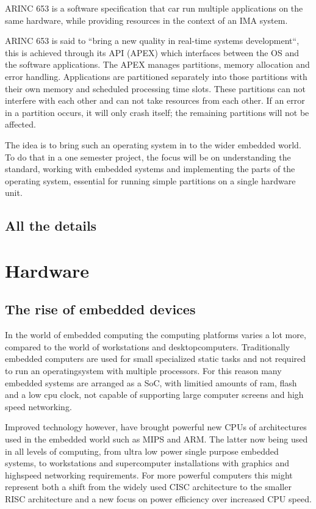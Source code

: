 ARINC 653 is a software specification that car run multiple applications on the same hardware, while providing resources in the context of an IMA system.

ARINC 653 is said to “bring a new quality in real-time systems development“,
this is achieved through its API (APEX) which interfaces between the OS and the software applications.
The APEX manages partitions, memory allocation and error handling.
Applications are partitioned separately into those partitions with their own memory and scheduled processing time slots.
These partitions can not interfere with each other and can not take resources from each other.
If an error in a partition occurs, it will only crash itself; the remaining partitions will not be affected.

The idea is to bring such an operating system in to the wider embedded world.
To do that in a one semester project, the focus will be on understanding the standard,
working with embedded systems and implementing the parts of the operating system,
essential for running simple partitions on a single hardware unit.

\subsection{All the details}


\section{Hardware}
\subsection{The rise of embedded devices}
In the world of embedded computing the computing platforms varies a lot more,
compared to the world of workstations and desktopcomputers.
Traditionally embedded computers are used for small specialized static tasks and
not required to run an operatingsystem with multiple processors.
For this reason many embedded systems are arranged as a SoC,
with limitied amounts of ram, flash and a low cpu clock,
not capable of supporting large computer screens and high speed networking.

Improved technology however, have brought powerful new CPUs of architectures used in the embedded world
such as MIPS and ARM.
The latter now being used in all levels of computing, from ultra low power single purpose embedded systems,
to workstations and supercomputer installations with graphics and highspeed networking requirements.
For more powerful computers this might represent both a shift from the widely used CISC architecture
to the smaller RISC architecture and a new focus on power efficiency over increased CPU speed.

